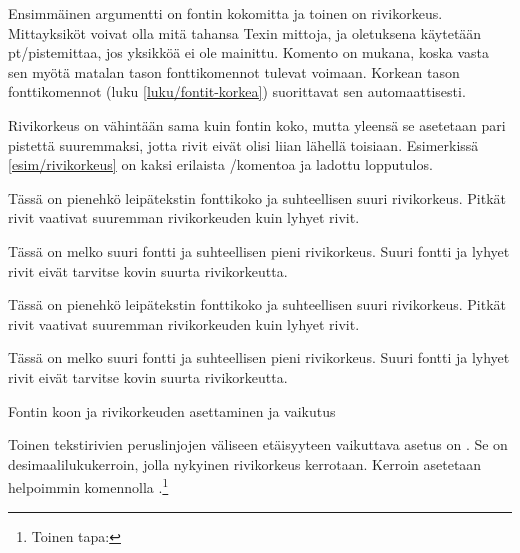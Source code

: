 \noindent
Ensimmäinen argumentti on fontin kokomitta ja toinen on rivikorkeus.
Mittayksiköt voivat olla mitä tahansa Texin mittoja, ja oletuksena
käytetään pt\-/pistemittaa, jos yksikköä ei ole mainittu. Komento
 on mukana, koska vasta sen myötä matalan tason
fonttikomennot tulevat voimaan. Korkean tason fonttikomennot (luku
\ref{luku/fontit-korkea}) suorittavat sen automaattisesti.

Rivikorkeus on vähintään sama kuin fontin koko, mutta yleensä se
asetetaan pari pistettä suuremmaksi, jotta rivit eivät olisi liian
lähellä toisiaan. Esimerkissä \ref{esim/rivikorkeus} on kaksi erilaista
\-/komentoa ja ladottu lopputulos.

\begin{esimerkki*}

\begin{koodilohko}
\fontsize{8bp}{11bp}\selectfont Tässä on pienehkö leipätekstin
fonttikoko ja suhteellisen suuri rivikorkeus. Pitkät rivit vaativat
suuremman rivikorkeuden kuin lyhyet rivit.

\fontsize{16bp}{17bp}\selectfont Tässä on melko suuri fontti ja
suhteellisen pieni rivikorkeus. Suuri fontti ja lyhyet rivit eivät
tarvitse kovin suurta rivikorkeutta.
\end{koodilohko}
  \begin{tulos}
    \fontsize{8bp}{11bp}\selectfont Tässä on pienehkö leipätekstin
    fonttikoko ja suhteellisen suuri rivikorkeus. Pitkät rivit vaativat
    suuremman rivikorkeuden kuin lyhyet rivit.

    \fontsize{16bp}{17bp}\selectfont Tässä on melko suuri fontti ja
    suhteellisen pieni rivikorkeus. Suuri fontti ja lyhyet rivit eivät
    tarvitse kovin suurta rivikorkeutta.
  \end{tulos}
  \caption{Fontin koon ja rivikorkeuden asettaminen ja vaikutus}
  \label{esim/rivikorkeus}
\end{esimerkki*}

Toinen tekstirivien peruslinjojen väliseen etäisyyteen vaikuttava asetus
on . Se on desimaalilukukerroin, jolla nykyinen
rivikorkeus kerrotaan. Kerroin asetetaan helpoimmin komennolla
.\footnote{Toinen tapa: }

\begin{koodilohkosis}
\fontsize{10bp}{12bp} \linespread{1.3} \selectfont
\end{koodilohkosis}

